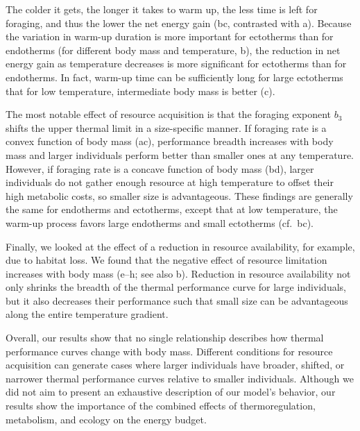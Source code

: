 The colder it gets, the longer it takes to warm up, the less time is left for foraging, and thus the lower the net energy gain (bc, contrasted with a).
Because the variation in warm-up duration is more important for ectotherms than for endotherms (for different body mass and temperature, b), the reduction in net energy gain as temperature decreases is more significant for ectotherms than for endotherms.
In fact, warm-up time can be sufficiently long for large ectotherms that for low temperature, intermediate body mass is better (c).


The most notable effect of resource acquisition is that the foraging exponent $b_3$ shifts the upper thermal limit in a size-specific manner.
If foraging rate is a convex function of body mass (ac), performance breadth increases with body mass and larger individuals perform better than smaller ones at any temperature.
However, if foraging rate is a concave function of body mass (bd), larger individuals do not gather enough resource at high temperature to offset their high metabolic costs, so smaller size is advantageous.
These findings are generally the same for endotherms and ectotherms, except that at low temperature, the warm-up process favors large endotherms and small ectotherms (cf.~bc).

Finally, we looked at the effect of a reduction in resource availability, for example, due to habitat loss.
We found that the negative effect of resource limitation increases with body mass (e--h; see also b).
Reduction in resource availability not only shrinks the breadth of the thermal performance curve for large individuals, but it also decreases their performance such that small size can be advantageous along the entire temperature gradient.

Overall, our results show that no single relationship describes how thermal performance curves change with body mass.
Different conditions for resource acquisition can generate cases where larger individuals have broader, shifted, or narrower thermal performance curves relative to smaller individuals.
Although we did not aim to present an exhaustive description of our model's behavior, our results show the importance of the combined effects of thermoregulation, metabolism, and ecology on the energy budget.
